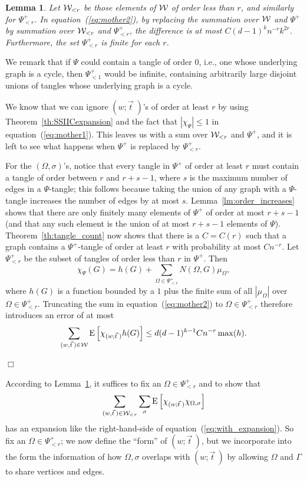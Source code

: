\documentclass[12pt]{article}
\newtheorem{lemma}[theorem]{Lemma}
\newcommand{\mob}{\mu}
\newcommand{\cw}{{\cal W}}
\newcommand{\tset}{{\Psi}}
\newcommand{\E}[1]{\mbox{E}\left[#1\right] }
\newcommand{\proof}{{\par\noindent {\bf Proof}\space\space}}
\newcommand{\proofbox}{\begin{flushright}$\Box$\end{flushright}}
\begin{document}
\begin{lemma}\label{lm:truncate}
Let $\cw_{<r}$  be those
elements of $\cw$ of order less than $r$,
and similarly for $\tset^+_{<r}$.
In equation~(\ref{eq:mother2}), by replacing the summation over $\cw$
and $\tset^+$ by summation over $\cw_{<r}$ and $\tset^+_{<r}$, the
difference is at most $C(d-1)^k n^{-r}k^{2r}$.
Furthermore, the set $\tset^+_{<r}$ is finite for each $r$.
\end{lemma}
We remark that if $\tset$ could contain a tangle of order $0$, i.e.,
one whose underlying graph is a cycle, then $\tset^+_{<1}$ would be
infinite, containing arbitrarily large disjoint unions of tangles
whose underlying graph is a cycle.
\proof
We know that we can ignore $(w;\vec t\;)$'s of order at least $r$ by
using
Theorem~\ref{th:SSIICexpansion} and the fact that $|\chi_\tset|\le 1$
in equation~(\ref{eq:mother1}).
This leaves us with a sum over $\cw_{<r}$ and $\tset^+$, and it is left
to see what happens when $\tset^+$ is replaced by $\tset^+_{<r}$.

For the $(\Omega,\sigma)$'s, notice that every tangle in $\tset^+$
of order at least $r$ must contain a tangle of order between
$r$ and $r+s-1$, where $s$ is the maximum number of edges in a $\tset$-tangle;
this follows because taking the union of any graph with a $\tset$-tangle
increases the number of edges by at most $s$.
Lemma~\ref{lm:order_increases} shows that there are only finitely many
elements of $\tset^+$ of order at most $r+s-1$ (and that any such element
is the union of at most $r+s-1$ elements of $\tset$).
Theorem~\ref{th:tangle_count} now shows that there is a $C=C(r)$
such that a graph contains a $\tset^+$-tangle of order at least $r$
with probability at most $Cn^{-r}$.  Let $\tset^+_{<r}$ be the subset
of tangles of order less than $r$ in $\tset^+$.  Then
$$
\chi_\tset(G) = h(G) + \sum_{\Omega\in \tset^+_{<r}} N(\Omega,G) \mob_\Omega,
$$
where $h(G)$ is a function bounded by a $1$ plus the finite sum
of all $|\mob_\Omega|$ over $\Omega\in \tset^+_{<r}$.
Truncating the sum
in equation~(\ref{eq:mother2}) to $\Omega\in \tset^+_{<r}$ therefore
introduces an error of at most
$$
\sum_{(w,\vec t\>)\in\cw} \E{\chi_{(w;\vec t\;)}h(G)}\le
d(d-1)^{k-1} C n^{-r} \max(h).
$$
\proofbox


According to Lemma~\ref{lm:truncate}, it suffices to fix an
$\Omega\in\tset^+_{<r}$ and to show that
\begin{equation}\label{eq:Omega_aim}
\sum_{(w,\vec t\>)\in\cw_{<r}}\sum_\sigma 
\E{\chi_{(w;\vec t\;)}\chi_{\Omega,\sigma}}
\end{equation}
has an expansion like the right-hand-side of 
equation~(\ref{eq:with_expansion}).
So fix an $\Omega\in\tset^+_{<r}$; we now define the ``form'' of
$(w;\vec t\>)$, but we incorporate into the form
the information of how $\Omega,\sigma$
overlaps with $(w;\vec t\>)$ by allowing $\Omega$ and $\Gamma$ to share
vertices and edges.
\end{document}
